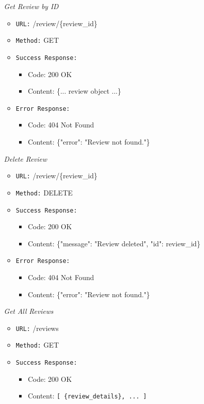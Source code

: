 \begin{itemize}
\item[\textit{Get Review by ID}]
\begin{itemize}
  \item \texttt{URL:} /review/\{review\_id\}  
  \item \texttt{Method:} GET  
  \item \texttt{Success Response:}
  \begin{itemize}
    \item Code: 200 OK  
    \item Content: \{... review object ...\}
  \end{itemize}
  \item \texttt{Error Response:}
  \begin{itemize}
    \item Code: 404 Not Found  
    \item Content: \{"error": "Review not found."\}
  \end{itemize}
\end{itemize}

\item[\textit{Delete Review}]
\begin{itemize}
  \item \texttt{URL:} /review/\{review\_id\}  
  \item \texttt{Method:} DELETE  
  \item \texttt{Success Response:}
  \begin{itemize}
    \item Code: 200 OK  
    \item Content: \{"message": "Review deleted", "id": review\_id\}
  \end{itemize}
  \item \texttt{Error Response:}
  \begin{itemize}
    \item Code: 404 Not Found  
    \item Content: \{"error": "Review not found."\}
  \end{itemize}
\end{itemize}

\item[\textit{Get All Reviews}]
\begin{itemize}
  \item \texttt{URL:} /reviews  
  \item \texttt{Method:} GET  
  \item \texttt{Success Response:}
  \begin{itemize}
    \item Code: 200 OK  
    \item Content: \texttt{[ \{review\_details\}, ... ]}
  \end{itemize}
\end{itemize}


\end{itemize}
